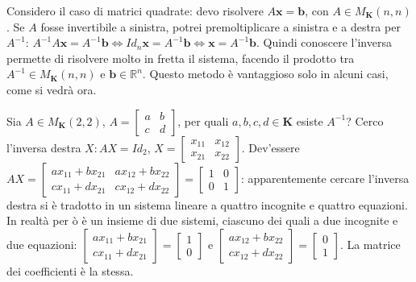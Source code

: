 \documentclass{article}
\begin{document}
Considero il caso di matrici quadrate: devo risolvere $A\mathbf{x}=\mathbf{b}
$, con $A\in M_{\mathbf{K}}\left( n,n\right) $. Se $A$ fosse invertibile a
sinistra, potrei premoltiplicare a sinistra e a destra per $A^{-1}$: $A^{-1}A%
\mathbf{x}=A^{-1}\mathbf{b}\Longleftrightarrow Id_{n}\mathbf{\mathbf{x}}%
=A^{-1}\mathbf{\mathbf{b}}\Longleftrightarrow \mathbf{x}=A^{-1}\mathbf{b}$.
Quindi conoscere l'inversa permette di risolvere molto in fretta il sistema,
facendo il prodotto tra $A^{-1}\in M_{\mathbf{K}}\left( n,n\right) $ e $%
\mathbf{b}\in 
\mathbb{R}
^{n}$. Questo metodo \`{e} vantaggioso solo in alcuni casi, come si vedr\`{a}
ora.

Sia $A\in M_{\mathbf{K}}\left( 2,2\right) $, $A=\left[ 
\begin{array}{cc}
a & b \\ 
c & d%
\end{array}%
\right] $, per quali $a,b,c,d\in \mathbf{K}$ esiste $A^{-1}$? Cerco
l'inversa destra $X:AX=Id_{2}$, $X=\left[ 
\begin{array}{cc}
x_{11} & x_{12} \\ 
x_{21} & x_{22}%
\end{array}%
\right] $. Dev'essere $AX=\left[ 
\begin{array}{cc}
ax_{11}+bx_{21} & ax_{12}+bx_{22} \\ 
cx_{11}+dx_{21} & cx_{12}+dx_{22}%
\end{array}%
\right] =\left[ 
\begin{array}{cc}
1 & 0 \\ 
0 & 1%
\end{array}%
\right] $: apparentemente cercare l'inversa destra si \`{e} tradotto in un
sistema lineare a quattro incognite e quattro equazioni. In realt\`{a} per%
\`{o} \`{e} un insieme di due sistemi, ciascuno dei quali a due incognite e
due equazioni: $\left[ 
\begin{array}{c}
ax_{11}+bx_{21} \\ 
cx_{11}+dx_{21}%
\end{array}%
\right] =\left[ 
\begin{array}{c}
1 \\ 
0%
\end{array}%
\right] $ e $\left[ 
\begin{array}{c}
ax_{12}+bx_{22} \\ 
cx_{12}+dx_{22}%
\end{array}%
\right] =\left[ 
\begin{array}{c}
0 \\ 
1%
\end{array}%
\right] $. La matrice dei coefficienti \`{e} la stessa.
\end{document}
